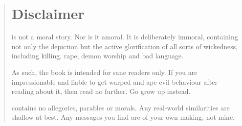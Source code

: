 \begin{quote}
\new
\section*{Disclaimer}
\booktitle{\RungerWarBook} is not a moral story. 
Nor is it amoral. 
It is deliberately immoral, containing not only the depiction but the active glorification of all sorts of wickedness, including killing, rape, demon worship and bad language. 

As such, the book is intended for sane readers only. 
If you are impressionable and liable to get warped and ape evil behaviour after reading about it, then read no further. 
Go grow up instead. 

\booktitle{\RungerWarBook} contains no allegories, parables or morals. 
Any real-world similarities are shallow at best. 
Any messages you find are of your own making, not mine. 


\end{quote}




